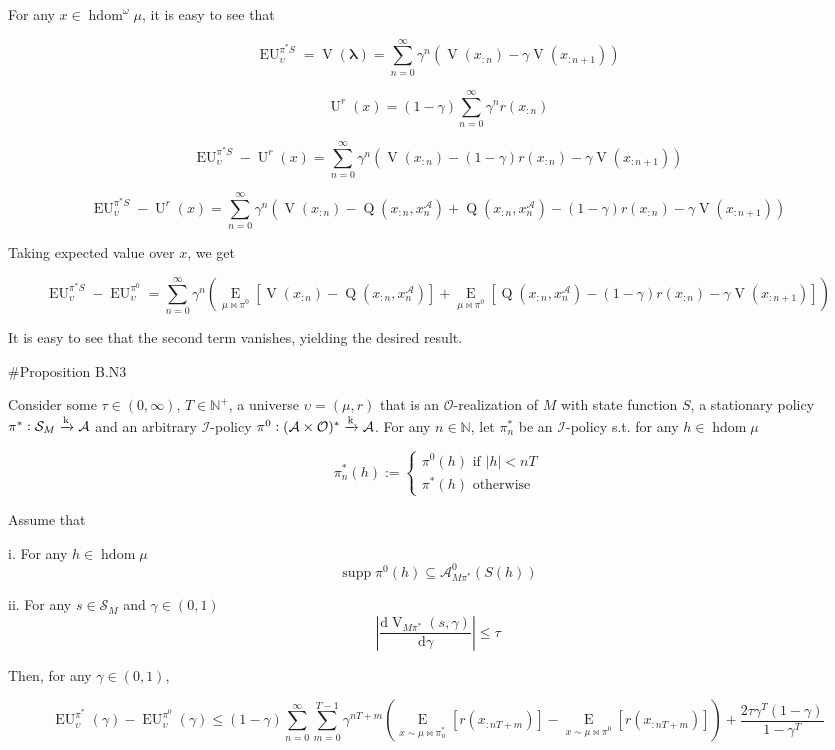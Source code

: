 \documentclass[a4paper]{article}
\DeclareMathOperator{\Supp}{supp}
\newcommand{\AP}[1]{\left(#1\right)}
\newcommand{\AB}[1]{\left[#1\right]}
\newcommand{\E}[1]{\underset{#1}{\operatorname{E}}}
\newcommand{\Ea}[2]{\underset{#1}{\operatorname{E}}\AB{#2}}
\newcommand{\D}{\mathrm{d}}
\newcommand{\Nats}{\mathbb{N}}
\newcommand{\Estr}{\boldsymbol{\lambda}}
\newcommand{\Abs}[1]{\left\vert #1 \right\vert}
\newcommand{\M}{\xrightarrow{\textnormal{k}}}
\newcommand{\Ob}{\mathcal{O}}
\newcommand{\A}{\mathcal{A}}
\newcommand{\St}{\mathcal{S}}
\newcommand{\In}{\mathcal{I}}
\newcommand{\FH}{(\A \times \Ob)^*}
\DeclareMathOperator{\HD}{hdom}
\newcommand{\Ut}{\operatorname{U}}
\newcommand{\V}{\operatorname{V}}
\newcommand{\Q}{\operatorname{Q}}
\newcommand{\EU}{\operatorname{EU}}
\begin{document}
For any $x \in \HD^\omega \mu$, it is easy to see that

$$\EU_{\upsilon}^{\pi^* S}=\V\AP{\Estr}=\sum_{n=0}^\infty \gamma^n \AP{\V\AP{x_{:n}}-\gamma\V\AP{x_{:n+1}}}$$

$$\Ut^{r}(x)=(1-\gamma)\sum_{n=0}^\infty \gamma^n r\AP{x_{:n}}$$

$$\EU_{\upsilon}^{\pi^* S} - \Ut^{r}(x)=\sum_{n=0}^\infty \gamma^n \AP{\V\AP{x_{:n}}-(1-\gamma)r\AP{x_{:n}}-\gamma\V\AP{x_{:n+1}}}$$

$$\EU_{\upsilon}^{\pi^* S} - \Ut^{r}(x)=\sum_{n=0}^\infty \gamma^n \AP{\V\AP{x_{:n}}-\Q\AP{x_{:n},x_n^\A}+\Q\AP{x_{:n},x_n^\A}-(1-\gamma)r\AP{x_{:n}}-\gamma\V\AP{x_{:n+1}}}$$

Taking expected value over $x$, we get

$$\EU_{\upsilon}^{\pi^* S} - \EU_{\upsilon}^{\pi^0}=\sum_{n=0}^\infty \gamma^n \AP{\Ea{\mu\bowtie\pi^0}{\V\AP{x_{:n}}-\Q\AP{x_{:n},x_n^\A}}+\Ea{\mu\bowtie\pi^0}{\Q\AP{x_{:n},x_n^\A}-(1-\gamma)r\AP{x_{:n}}-\gamma\V\AP{x_{:n+1}}}}$$

It is easy to see that the second term vanishes, yielding the desired result.

\#Proposition B.N3

Consider some $\tau\in(0,\infty)$, $T\in\Nats^+$, a universe $\upsilon=(\mu,r)$ that is an $\Ob$-realization of $M$ with state function $S$, a stationary policy $\pi^*: \St_M \M \A$ and an arbitrary $\In$-policy $\pi^0: \FH \M \A$. For any $n \in \Nats$, let $\pi^*_n$ be an $\In$-policy s.t. for any $h \in \HD{\mu}$

$$\pi^*_n(h):=\begin{cases} \pi^0(h) \text{ if } \Abs{h} < nT \\ \pi^*(h) \text{ otherwise} \end{cases}$$

Assume that

i. For any $h \in \HD{\mu}$ $$\Supp{\pi^0(h)} \subseteq \A_{M\pi^*}^0\AP{S(h)}$$

ii. For any $s \in \St_M$ and $\gamma\in(0,1)$ $$\Abs{\frac{\D\V_{M\pi^*}\AP{s,\gamma}}{\D\gamma}} \leq \tau$$

Then, for any $\gamma\in(0,1)$,

$$\EU^{\pi^*}_\upsilon(\gamma)-\EU^{\pi^0}_\upsilon(\gamma) \leq (1-\gamma)\sum_{n=0}^\infty \sum_{m=0}^{T-1} \gamma^{nT+m}\left(\E{x\sim\mu\bowtie\pi^*_n}\left[r\left(x_{:nT+m}\right)\right]-\E{x\sim\mu\bowtie\pi^0}\left[r\left(x_{:nT+m}\right)\right]\right) + \frac{2\tau\gamma^T(1-\gamma)}{1-\gamma^T}$$
\end{document}
